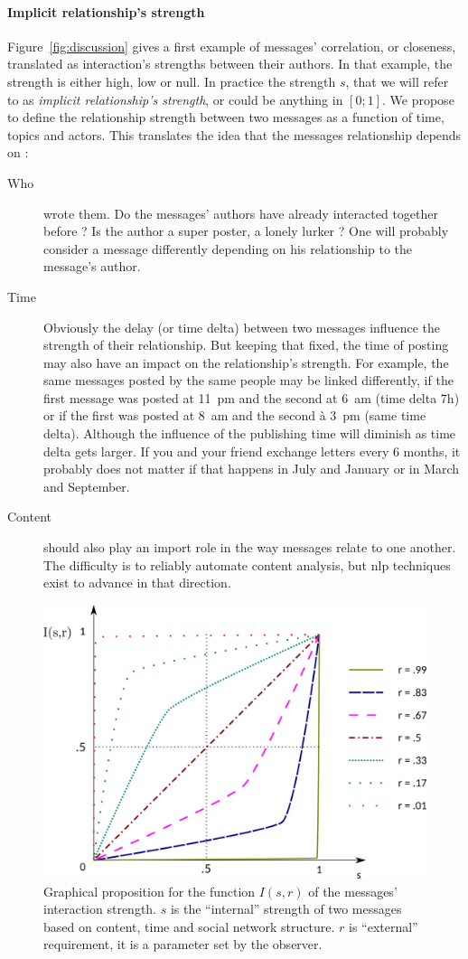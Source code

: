 \documentclass[a4paper,twoside]{article}
\begin{document}
\paragraph{Implicit relationship's strength}
Figure~\ref{fig:discussion} gives a first example of messages' correlation, or closeness, translated as interaction's strengths between their authors.  In that example, the strength is either high, low or null.  In practice the strength $s$, that we will refer to as \emph{implicit relationship's strength}, or could be anything in $[0;1]$.
We propose to define the relationship strength between two messages as a function of time, topics and actors.  This translates the idea that the messages relationship depends on :
\begin{description}
\item[{Who}] wrote them.  Do the messages' authors have already interacted together before ? Is the author a super poster, a lonely lurker ? One will probably consider a message differently depending on his relationship to the message's author.
\item[{Time}] Obviously the delay (or time delta) between two messages influence the strength of their relationship.  But keeping that fixed, the time of posting may also have an impact on the relationship's strength.  For example, the same messages posted by the same people may be linked differently, if the first message was posted at 11~pm and the second at 6~am (time delta 7h) or if the first was posted at 8~am and the second à 3~pm (same time delta).  Although the influence of the publishing time will diminish as time delta gets larger.  If you and your friend exchange letters every 6 months, it probably does not matter if that happens in July and January or in March and September.
\item[{Content}] should also play an import role in the way messages relate to one another.  The difficulty is to reliably automate content analysis, but \gls{nlp} techniques exist to advance in that direction.
 
\end{description}
\begin{figure}[b]
 \small{
  \caption{\label{fig:func} Graphical proposition for the function $I(s,r)$ of the messages' interaction strength.  $s$ is the ``internal'' strength of two messages based on content, time and social network structure.  $r$ is ``external'' requirement, it is a parameter set by the observer.
  }}
 \includegraphics[width=.5\textwidth]{images/func.png}
\end{figure}
\end{document}
